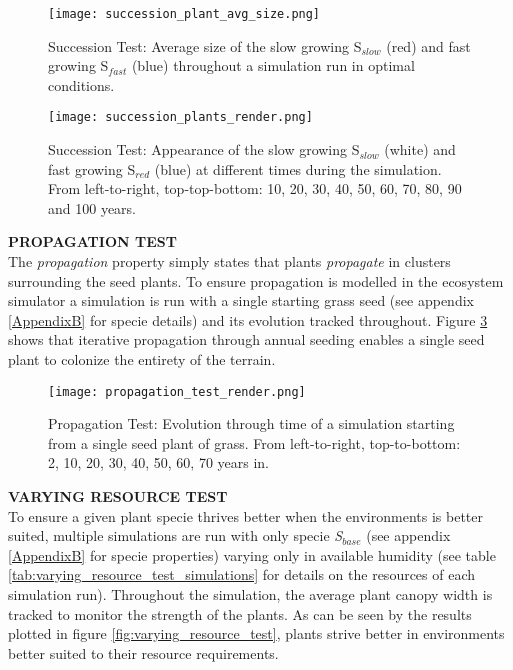 \begin{figure}
\center
	\texttt{[image: succession\_plant\_avg\_size.png]}
	\caption{ Succession Test: Average size of the slow growing S$_{slow}$ (red) and fast growing S$_{fast}$ (blue) throughout a simulation run in optimal conditions. }
	\label{fig:succession_plants_avg_size}
\end{figure}

\begin{figure}
\center
	\texttt{[image: succession\_plants\_render.png]}
	\caption{ Succession Test: Appearance of the slow growing S$_{slow}$ (white) and fast growing S$_{red}$ (blue) at different times during the simulation. From left-to-right, top-top-bottom: 10, 20, 30, 40, 50, 60, 70, 80, 90 and 100 years.}
	\label{fig:succession_plants_render}
\end{figure}

\textbf{PROPAGATION TEST}\\

The \textit{propagation} property simply states that plants \textit{propagate} in clusters surrounding the seed plants. To ensure propagation is modelled in the ecosystem simulator a simulation is run with a single starting grass seed (see appendix \ref{AppendixB} for specie details) and its evolution tracked throughout. Figure \ref{fig:propagation_test_render} shows that iterative propagation through annual seeding enables a single seed plant to colonize the entirety of the terrain. \\

\begin{figure}
\center
	\texttt{[image: propagation\_test\_render.png]}
	\caption{ Propagation Test: Evolution through time of a simulation starting from a single seed plant of grass. From left-to-right, top-to-bottom: 2, 10, 20, 30, 40, 50, 60, 70 years in.}
	\label{fig:propagation_test_render}
\end{figure}

\textbf{VARYING RESOURCE TEST} \\

To ensure a given plant specie thrives better when the environments is better suited, multiple simulations are run with only specie \textit{S$_{base}$} (see appendix \ref{AppendixB} for specie properties) varying only in available humidity (see table \ref{tab:varying_resource_test_simulations} for details on the resources of each simulation run). Throughout the simulation, the average plant canopy width is tracked to monitor the strength of the plants. As can be seen by the results plotted in figure \ref{fig:varying_resource_test}, plants strive better in environments better suited to their resource requirements.\\

